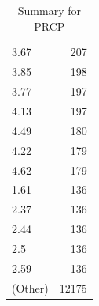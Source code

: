 \begin{table}[ht]
\begin{tabular}{lr}
  3.67 & 207 \\ 
  3.85 & 198 \\ 
  3.77 & 197 \\ 
  4.13 & 197 \\ 
  4.49 & 180 \\ 
  4.22 & 179 \\ 
  4.62 & 179 \\ 
  1.61 & 136 \\ 
  2.37 & 136 \\ 
  2.44 & 136 \\ 
  2.5 & 136 \\ 
  2.59 & 136 \\ 
  (Other) & 12175 \\ 
   \hline
\end{tabular}
\caption{Summary for PRCP} 
\label{tab: PRCP}
\end{table}

